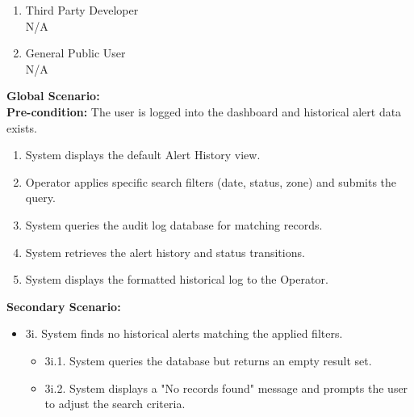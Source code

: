 {\begin{enumerate}[{\bf BE1.}]
\begin{enumerate}[{\bf VP1.}]
            {\bf Secondary Scenario:}
            \begin{itemize}
                \item[] {4i.} System finds no historical alerts matching the applied filters.
                \begin{itemize}
                    \item[] {4i.1.} System queries the database but returns an empty result set.
                    \item[] {4i.2.} System displays a "No historical alerts found for the selected criteria" message and prompts the Operator to clear or adjust the filters.
                \end{itemize}
            \end{itemize}
        \item {Third Party Developer} \\ N/A
        \item General Public User \\ N/A
    \end{enumerate}
    {\bf Global Scenario:} \\
    {\bf Pre-condition:} The user is logged into the dashboard and historical alert data exists.
        \begin{enumerate}[1. ]
            \item System displays the default Alert History view.
            \item Operator applies specific search filters (date, status, zone) and submits the query.
            \item System queries the audit log database for matching records.
            \item System retrieves the alert history and status transitions.
            \item System displays the formatted historical log to the Operator.
        \end{enumerate}

    {\bf Secondary Scenario:}
        \begin{itemize}
            \item[] {3i.} System finds no historical alerts matching the applied filters.
            \begin{itemize}
                \item[] {3i.1.} System queries the database but returns an empty result set.
                \item[] {3i.2.} System displays a "No records found" message and prompts the user to adjust the search criteria.
            \end{itemize}
        \end{itemize}


\end{enumerate}}
